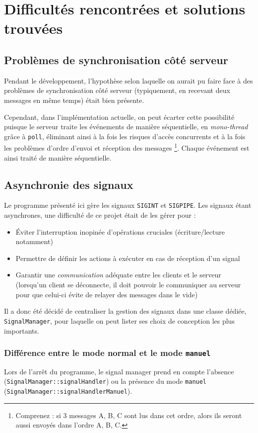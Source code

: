 \documentclass{article}
\begin{document}
\section{Difficultés rencontrées et solutions trouvées}
\subsection{Problèmes de synchronisation côté serveur}
Pendant le développement, l'hypothèse selon laquelle on aurait pu faire face à des problèmes de synchronisation côté serveur (typiquement, en recevant deux messages en même temps) était bien présente.

Cependant, dans l'implémentation actuelle, on peut écarter cette possibilité puisque le serveur traite les événements de manière séquentielle, en \textit{mono-thread} grâce à \texttt{poll}, éliminant ainsi à la fois les risques d'accès concurrents et à la fois les problèmes d'ordre d'envoi et réception des messages \footnote{Comprenez : si 3 messages A, B, C sont lus dans cet ordre, alors ils seront aussi envoyés dans l'ordre A, B, C.}. Chaque événement est ainsi traité de manière séquentielle.

\subsection{Asynchronie des signaux}
Le programme présenté ici gère les signaux \texttt{SIGINT} et \texttt{SIGPIPE}. Les signaux étant asynchrones, une difficulté de ce projet était de les gérer pour :
\begin{itemize}
    \item Éviter l'interruption inopinée d'opérations cruciales (écriture/lecture notamment)
    \item Permettre de définir les actions à exécuter en cas de réception d'un signal
    \item Garantir une \textit{communication} adéquate entre les clients et le serveur (lorsqu'un client se déconnecte, il doit pouvoir le communiquer au serveur pour que celui-ci évite de relayer des messages dans le vide)
\end{itemize}

Il a donc été décidé de centraliser la gestion des signaux dans une classe dédiée, \texttt{SignalManager}, pour laquelle on peut lister ses choix de conception les plus importants.



\subsubsection{Différence entre le mode normal et le mode \texttt{manuel}}
Lors de l'arrêt du programme, le signal manager prend en compte l'absence (\texttt{SignalManager::signalHandler}) ou la présence du mode \texttt{manuel} (\texttt{SignalManager::signalHandlerManuel}).
\end{document}
